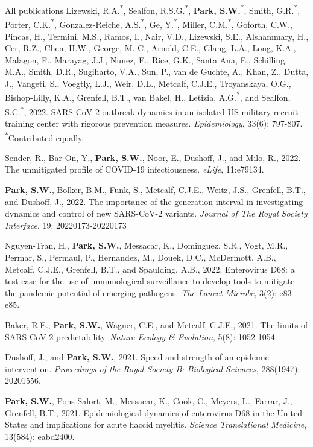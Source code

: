 \documentclass[
	11pt, %
]{resume} %
\begin{document}
\begin{rSection}{All publications}
Lizewski, R.A.\textsuperscript{*}, Sealfon, R.S.G.\textsuperscript{*}, \textbf{Park, S.W.}\textsuperscript{*}, Smith, G.R.\textsuperscript{*}, Porter, C.K.\textsuperscript{*}, Gonzalez-Reiche, A.S.\textsuperscript{*}, Ge, Y.\textsuperscript{*}, Miller, C.M.\textsuperscript{*}, Goforth, C.W., Pincas, H., Termini, M.S., Ramos, I., Nair, V.D., Lizewski, S.E., Alshammary, H., Cer, R.Z., Chen, H.W., George, M.-C., Arnold, C.E., Glang, L.A., Long, K.A., Malagon, F., Marayag, J.J., Nunez, E., Rice, G.K., Santa Ana, E., Schilling, M.A., Smith, D.R., Sugiharto, V.A., Sun, P., van de Guchte, A., Khan, Z., Dutta, J., Vangeti, S., Voegtly, L.J., Weir, D.L., Metcalf, C.J.E., Troyanskaya, O.G., Bishop-Lilly, K.A., Grenfell, B.T., van Bakel, H., Letizia, A.G.\textsuperscript{*}, and Sealfon, S.C.\textsuperscript{*}, 2022. SARS-CoV-2 outbreak dynamics in an isolated US military recruit training center with rigorous prevention measures. \textit{Epidemiology}, 33(6): 797-807.\\
\textsuperscript{*}Contributed equally.

Sender, R., Bar-On, Y., \textbf{Park, S.W.}, Noor, E., Dushoff, J., and Milo, R., 2022. The unmitigated profile of COVID-19 infectiousness. \textit{eLife}, 11:e79134.

\textbf{Park, S.W.}, Bolker, B.M., Funk, S., Metcalf, C.J.E., Weitz, J.S., Grenfell, B.T., and Dushoff, J., 2022. The importance of the generation interval in investigating dynamics and control of new SARS-CoV-2 variants. \textit{Journal of The Royal Society Interface}, 19: 20220173-20220173

Nguyen-Tran, H., \textbf{Park, S.W.}, Messacar, K., Dominguez, S.R., Vogt, M.R., Permar, S., Permaul, P., Hernandez, M., Douek, D.C., McDermott, A.B., Metcalf, C.J.E., Grenfell, B.T., and Spaulding, A.B., 2022. Enterovirus D68: a test case for the use of immunological surveillance to develop tools to mitigate the pandemic potential of emerging pathogens. \textit{The Lancet Microbe}, 3(2): e83-e85.

Baker, R.E., \textbf{Park, S.W.}, Wagner, C.E., and Metcalf, C.J.E., 2021. The limits of SARS-CoV-2 predictability. \textit{Nature Ecology \& Evolution}, 5(8): 1052-1054.

Dushoff, J., and \textbf{Park, S.W.}, 2021. Speed and strength of an epidemic intervention. \textit{Proceedings of the Royal Society B: Biological Sciences}, 288(1947): 20201556.

\textbf{Park, S.W.}, Pons-Salort, M., Messacar, K., Cook, C., Meyers, L., Farrar, J., Grenfell, B.T., 2021. Epidemiological dynamics of enterovirus D68 in the United States and implications for acute flaccid myelitis. \textit{Science Translational Medicine}, 13(584): eabd2400.


\end{rSection}
\end{document}
